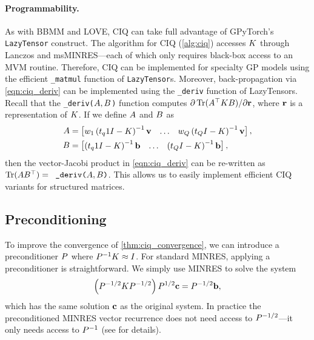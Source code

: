 \paragraph{Programmability.}
As with BBMM and LOVE, CIQ can take full advantage of GPyTorch's {\tt LazyTensor} construct.
The algorithm for CIQ (\cref{alg:ciq}) accesses $K$ through Lanczos and msMINRES---each of which only requires black-box access to an MVM routine.
Therefore, CIQ can be implemented for specialty GP models using the efficient {\tt \_matmul} function of {\tt LazyTensor}s.
Moreover, back-propagation via \cref{eqn:ciq_deriv} can be implemented using the {\tt \_deriv} function of LazyTensors.
Recall that the {\tt \_deriv($ A, B $)} function computes $\partial \tr{ \bA^\top \bK \bB }/{\partial \br}$, where $\mathbf{r}$ is a representation of $K$.
If we define $A$ and $B$ as
%
\begin{align*}
  A &= \begin{bmatrix}
    w_1 \left( t_q1I - K \right)^{-1} \mathbf{v}
    & \ldots &
    w_Q \left( t_Q I - K \right)^{-1} \mathbf{v}
  \end{bmatrix},
  \\
  B &= \begin{bmatrix}
    \left( t_q1I - K \right)^{-1} \mathbf{b}
    & \ldots &
    \left( t_Q I - K \right)^{-1} \mathbf{b}
  \end{bmatrix},
\end{align*}
%
then the vector-Jacobi product in \cref{eqn:ciq_deriv} can be re-written as $\tr{ \bA \bB^\top } = \texttt{ \_deriv($\bA, \bB$)}$.
This allows us to easily implement efficient CIQ variants for structured matrices.


\subsection{Preconditioning}
\label{sec:ciq_precond}

To improve the convergence of \cref{thm:ciq_convergence}, we can introduce a preconditioner $P$ where $P^{-1} K \approx I$.
For standard MINRES, applying a preconditioner is straightforward.
We simply use MINRES to solve the system
\[
  \left( P^{-1/2} K P^{-1/2} \right) P^{1/2} \mathbf{c} = P^{-1/2} \mathbf{b},
\]
which has the same solution $\mathbf{c}$ as the original system.
In practice the preconditioned MINRES vector recurrence does not need access to $P^{-1/2}$---it only needs access to $P^{-1}$
(see \citep[][Ch. 3.4]{choi2006iterative} for details).

